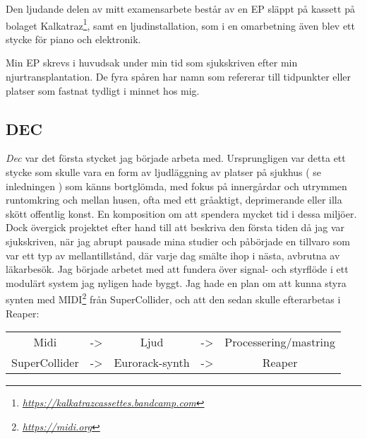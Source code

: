 \documentclass{article}
\begin{document}
  Den ljudande delen av mitt examensarbete består av en EP släppt på kassett på bolaget
  Kalkatraz\footnote{\emph{\url{https://kalkatrazcassettes.bandcamp.com}}}, samt en ljudinstallation, som i en omarbetning även blev
  ett stycke för piano och elektronik.

  Min EP skrevs i huvudsak under min tid som sjukskriven efter min njurtransplantation. De fyra spåren har
  namn som refererar till tidpunkter eller platser som fastnat tydligt i minnet hos mig. 

\subsection{DEC}
\emph{Dec} var det första stycket jag började arbeta med. Ursprungligen var detta ett stycke som skulle
vara en form av ljudläggning av platser på sjukhus ( se inledningen ) som känns bortglömda, med fokus på
innergårdar och utrymmen runtomkring och mellan husen, ofta med ett gråaktigt, deprimerande eller illa
skött offentlig konst. En komposition om att spendera mycket tid i dessa miljöer. Dock övergick projektet
efter hand till att beskriva den första tiden då jag var sjukskriven, när jag abrupt pausade mina studier
och påbörjade en tillvaro som var ett typ av mellantillstånd, där varje dag smälte ihop i nästa, avbrutna
av läkarbesök.
Jag började arbetet med att fundera över signal- och styrflöde i ett modulärt system jag nyligen hade
byggt. Jag hade en plan om att kunna styra synten med MIDI\footnote{\emph{\url{https://midi.org}}} från SuperCollider, och att
den sedan skulle efterarbetas i Reaper:
\begin{center}
	\begin{tabular}{ c c c c c }
		Midi		  & -> & Ljud			& -> & Processering/mastring \\
		SuperCollider & -> & Eurorack-synth & -> & Reaper
	\end{tabular}
\end{center}
\end{document}
